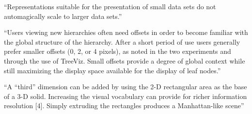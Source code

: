 \enquote{Representations suitable for the presentation of small data sets do not automagically scale to larger data sets.}\cite[161]{johnson1993treemapsPhd}

\enquote{Users viewing new hierarchies often need offsets in order to become familiar with the global structure of the hierarchy. After a short period of use users generally prefer smaller offsets (0, 2, or 4 pixels), as noted in the two experiments and through the use of TreeViz. Small offsets provide a degree of global context while still maximizing the display space available for the display of leaf nodes.}\cite[3]{johnson1992improving}

\enquote{A “third” dimension can be added by using the 2-D rectangular area as the base of a 3-D solid. Increasing the visual vocabulary can provide for richer information resolution [4]. Simply extruding the rectangles produces a Manhattan-like scene}\cite[5]{johnson1992improving}